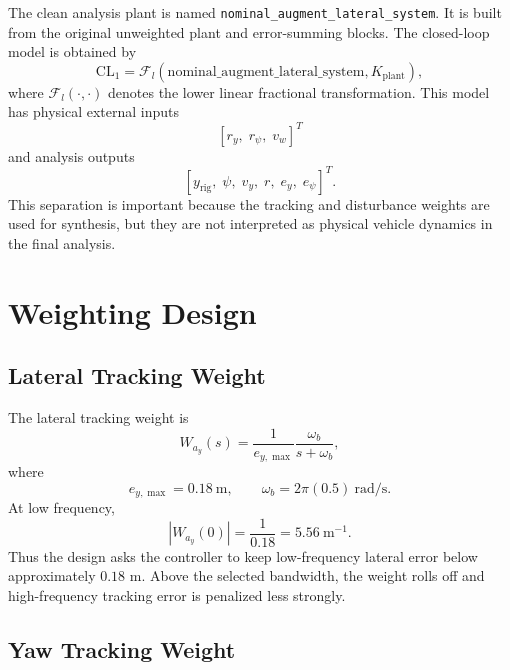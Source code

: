 \documentclass[10pt,twocolumn]{article}
\begin{document}
The clean analysis plant is named
\texttt{nominal\_augment\_lateral\_system}. It is built from the original
unweighted plant and error-summing blocks. The closed-loop model is obtained by
\begin{equation}
    \mathrm{CL}_1 =
    \mathcal{F}_{l}
    \left(
        \mathrm{nominal\_augment\_lateral\_system},
        K_{\mathrm{plant}}
    \right),
\end{equation}
where $\mathcal{F}_l(\cdot,\cdot)$ denotes the lower linear fractional
transformation. This model has physical external inputs
\begin{equation}
    \left[
        r_y,\; r_\psi,\; v_w
    \right]^T
\end{equation}
and analysis outputs
\begin{equation}
    \left[
        y_{\mathrm{rig}},\; \psi,\; v_y,\; r,\; e_y,\; e_\psi
    \right]^T .
\end{equation}
This separation is important because the tracking and disturbance weights are
used for synthesis, but they are not interpreted as physical vehicle dynamics
in the final analysis.

\section{Weighting Design}

\subsection{Lateral Tracking Weight}

The lateral tracking weight is
\begin{equation}
    W_{a_y}(s)
    =
    \frac{1}{e_{y,\max}}
    \frac{\omega_b}{s+\omega_b},
\end{equation}
where
\begin{equation}
    e_{y,\max}=0.18~\mathrm{m},
    \qquad
    \omega_b = 2\pi(0.5)~\mathrm{rad/s}.
\end{equation}
At low frequency,
\begin{equation}
    |W_{a_y}(0)| =
    \frac{1}{0.18}
    =
    5.56~\mathrm{m}^{-1}.
\end{equation}
Thus the design asks the controller to keep low-frequency lateral error below
approximately $0.18$ m. Above the selected bandwidth, the weight rolls off and
high-frequency tracking error is penalized less strongly.

\subsection{Yaw Tracking Weight}
\end{document}
